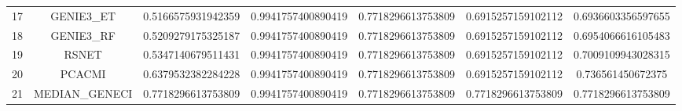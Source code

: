 \documentclass[a4paper,10pt]{article}
\begin{document}
\begin{landscape}
\begin{table}[!htp]
\begin{tabular}{ccccccc}
17&GENIE3_ET&0.5166575931942359&0.9941757400890419&0.7718296613753809&0.6915257159102112&0.6936603356597655\\
18&GENIE3_RF&0.5209279175325187&0.9941757400890419&0.7718296613753809&0.6915257159102112&0.6954066616105483\\
19&RSNET&0.5347140679511431&0.9941757400890419&0.7718296613753809&0.6915257159102112&0.7009109943028315\\
20&PCACMI&0.6379532382284228&0.9941757400890419&0.7718296613753809&0.6915257159102112&0.736561450672375\\
21&MEDIAN_GENECI&0.7718296613753809&0.9941757400890419&0.7718296613753809&0.7718296613753809&0.7718296613753809\\
\hline
\end{tabular}
\end{table}

\end{landscape}
\end{document}

